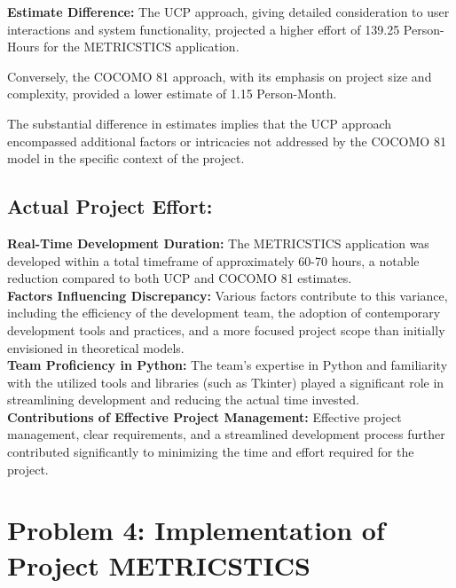 {{{{\textbf{Estimate Difference: }The UCP approach, giving detailed consideration to user interactions and system functionality, projected a higher effort of 139.25 Person-Hours for the METRICSTICS application.\linebreak

Conversely, the COCOMO 81 approach, with its emphasis on project size and complexity, provided a lower estimate of 1.15 Person-Month.\linebreak

The substantial difference in estimates implies that the UCP approach encompassed additional factors or intricacies not addressed by the COCOMO 81 model in the specific context of the project.\linebreak
}
\subsection{Actual Project Effort:}
\normalsize{
\textbf{Real-Time Development Duration: }The METRICSTICS application was developed within a total timeframe of approximately 60-70 hours, a notable reduction compared to both UCP and COCOMO 81 estimates.\linebreak \\

\textbf{Factors Influencing Discrepancy: }Various factors contribute to this variance, including the efficiency of the development team, the adoption of contemporary development tools and practices, and a more focused project scope than initially envisioned in theoretical models.\linebreak \\ 

\textbf{Team Proficiency in Python: }The team's expertise in Python and familiarity with the utilized tools and libraries (such as Tkinter) played a significant role in streamlining development and reducing the actual time invested.
\linebreak \\
\textbf{Contributions of Effective Project Management: }Effective project management, clear requirements, and a streamlined development process further contributed significantly to minimizing the time and effort required for the project.
}


\newpage
\section{Problem 4: Implementation of Project METRICSTICS}

}}}
